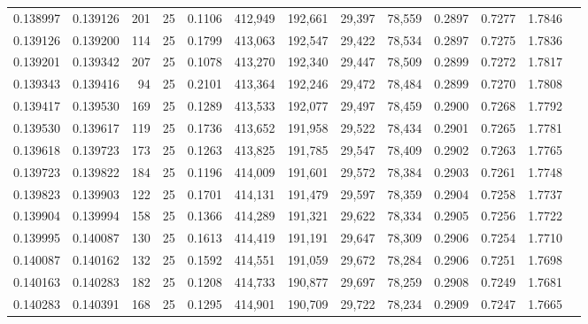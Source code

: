 \begin{tabular}{rrrrrrrrrrrrr}
0.138997 & 0.139126 &   201 &  25 &                                     0.1106 & 412,949 & 192,661 &  29,397 &  78,559 & 0.2897 & 0.7277 & 1.7846 \\
0.139126 & 0.139200 &   114 &  25 &                                     0.1799 & 413,063 & 192,547 &  29,422 &  78,534 & 0.2897 & 0.7275 & 1.7836 \\
0.139201 & 0.139342 &   207 &  25 &                                     0.1078 & 413,270 & 192,340 &  29,447 &  78,509 & 0.2899 & 0.7272 & 1.7817 \\
0.139343 & 0.139416 &    94 &  25 &                                     0.2101 & 413,364 & 192,246 &  29,472 &  78,484 & 0.2899 & 0.7270 & 1.7808 \\
0.139417 & 0.139530 &   169 &  25 &                                     0.1289 & 413,533 & 192,077 &  29,497 &  78,459 & 0.2900 & 0.7268 & 1.7792 \\
0.139530 & 0.139617 &   119 &  25 &                                     0.1736 & 413,652 & 191,958 &  29,522 &  78,434 & 0.2901 & 0.7265 & 1.7781 \\
0.139618 & 0.139723 &   173 &  25 &                                     0.1263 & 413,825 & 191,785 &  29,547 &  78,409 & 0.2902 & 0.7263 & 1.7765 \\
0.139723 & 0.139822 &   184 &  25 &                                     0.1196 & 414,009 & 191,601 &  29,572 &  78,384 & 0.2903 & 0.7261 & 1.7748 \\
0.139823 & 0.139903 &   122 &  25 &                                     0.1701 & 414,131 & 191,479 &  29,597 &  78,359 & 0.2904 & 0.7258 & 1.7737 \\
0.139904 & 0.139994 &   158 &  25 &                                     0.1366 & 414,289 & 191,321 &  29,622 &  78,334 & 0.2905 & 0.7256 & 1.7722 \\
0.139995 & 0.140087 &   130 &  25 &                                     0.1613 & 414,419 & 191,191 &  29,647 &  78,309 & 0.2906 & 0.7254 & 1.7710 \\
0.140087 & 0.140162 &   132 &  25 &                                     0.1592 & 414,551 & 191,059 &  29,672 &  78,284 & 0.2906 & 0.7251 & 1.7698 \\
0.140163 & 0.140283 &   182 &  25 &                                     0.1208 & 414,733 & 190,877 &  29,697 &  78,259 & 0.2908 & 0.7249 & 1.7681 \\
0.140283 & 0.140391 &   168 &  25 &                                     0.1295 & 414,901 & 190,709 &  29,722 &  78,234 & 0.2909 & 0.7247 & 1.7665 \\

\end{tabular}
